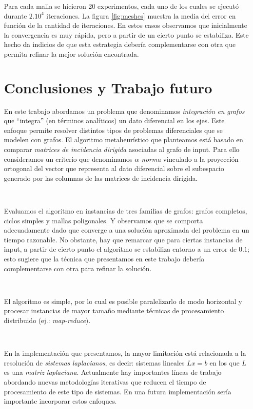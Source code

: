 \documentclass[conference,compsoc,a4paper]{IEEEtran}
\begin{document}
\smallskip

Para cada malla se hicieron 20 experimentos, cada uno de los cuales se 
ejecutó durante $2.10^4$ iteraciones. La figura \ref{fig:meshes} 
muestra la media del error en función de la cantidad de iteraciones. En 
estos casos observamos que inicialmente la convergencia es muy rápida, 
pero a partir de un cierto punto se estabiliza. Este hecho da 
indicios de que esta estrategia debería complementarse con otra que 
permita refinar la mejor solución encontrada.


\section{Conclusiones y Trabajo futuro}

En este trabajo abordamos un problema que denominamos \emph{integración 
en grafos} que ``integra'' (en términos analíticos) un dato 
diferencial en los ejes. Este enfoque permite resolver distintos tipos 
de problemas diferenciales que se modelen con grafos. El algoritmo 
metaheurístico que planteamos está basado en comparar \emph{matrices 
de incidencia dirigida} asociadas al grafo de input. Para ello 
consideramos un criterio que denominamos \emph{$\alpha$-norma} vinculado 
a la proyección ortogonal del vector que representa al dato diferencial 
sobre el subespacio generado por las columnas de las matrices de 
incidencia dirigida.

\

Evaluamos el algoritmo en instancias de tres familias de grafos: grafos 
completos, ciclos simples y mallas poligonales. Y observamos que se comporta 
adecuadamente dado que converge a una solución aproximada del problema 
en un tiempo razonable. No obstante, hay que remarcar que para ciertas 
instancias de input, a partir de cierto punto el algoritmo se 
estabiliza entorno a un error de $0.1$; esto sugiere que la técnica que 
presentamos en este trabajo debería complementarse con otra para 
refinar la solución.

\

El algoritmo es simple, por lo cual es posible paralelizarlo de modo 
horizontal y procesar instancias de mayor tamaño mediante técnicas 
de procesamiento distribuido (ej.: \emph{map-reduce}).

\

En la implementación que presentamos, la mayor limitación está 
relacionada a la resolución de \emph{sistemas laplacianos}, es decir: 
sistemas lineales $Lx=b$ en los que $L$ es una \emph{matriz 
laplaciana}. Actualmente hay importantes líneas de trabajo abordando 
nuevas metodologías iterativas que reducen el tiempo de 
procesamiento de este tipo de sistemas. En una futura implementación
 sería importante incorporar estos enfoques. 
\end{document}
